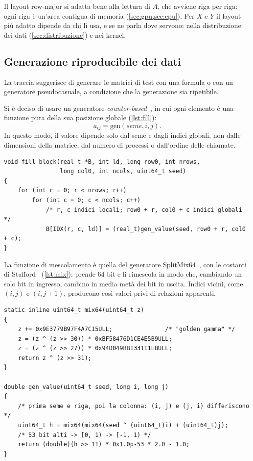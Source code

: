 \documentclass[11pt,a4paper]{article}
\begin{document}
Il layout row-major si adatta bene alla lettura di $A$, che avviene riga per
riga: ogni riga è un'area contigua di memoria (\cref{sec:gpu,sec:cpu}). Per
$X$ e $Y$ il layout più adatto dipende da chi li usa, e se ne parla dove
servono: nella distribuzione dei dati (\cref{sec:distribuzione}) e nei kernel.

\subsection{Generazione riproducibile dei dati}\label{sec:generazione}

La traccia suggerisce di generare le matrici di test con una formula o con un
generatore pseudocasuale, a condizione che la generazione sia ripetibile.

Si è deciso di usare un generatore \emph{counter-based}~\cite{salmon2011}, in cui ogni
elemento è una funzione pura della sua posizione globale (\cref{lst:fill}):
\[
  a_{ij} = \mathrm{gen}(\mathit{seme}, i, j).
\]
In questo modo, il valore dipende solo dal seme e dagli indici globali, non dalle dimensioni
della matrice, dal numero di processi o dall'ordine delle chiamate.

\begin{lstlisting}[caption={Generazione di un blocco di $A$ a partire dagli indici globali (\texttt{matgen.c}).}, label={lst:fill}]
void fill_block(real_t *B, int ld, long row0, int nrows,
                long col0, int ncols, uint64_t seed)
{
    for (int r = 0; r < nrows; r++)
        for (int c = 0; c < ncols; c++)
            /* r, c indici locali; row0 + r, col0 + c indici globali */
            B[IDX(r, c, ld)] = (real_t)gen_value(seed, row0 + r, col0 + c);
}
\end{lstlisting}

La funzione di mescolamento è quella del generatore
SplitMix64~\cite{steele2014}, con le costanti di Stafford~\cite{stafford2011}
(\cref{lst:mix}):
prende 64 bit e li rimescola in modo che, cambiando un solo bit in ingresso,
cambino in media metà dei bit in uscita. Indici vicini, come $(i, j)$ e
$(i, j+1)$, producono così valori privi di relazioni apparenti.

\begin{lstlisting}[caption={Funzione di mescolamento SplitMix64 e calcolo del valore di un elemento (\texttt{matgen.c}).}, label={lst:mix}]
static inline uint64_t mix64(uint64_t z)
{
    z += 0x9E3779B97F4A7C15ULL;               /* "golden gamma" */
    z = (z ^ (z >> 30)) * 0xBF58476D1CE4E5B9ULL;
    z = (z ^ (z >> 27)) * 0x94D049BB133111EBULL;
    return z ^ (z >> 31);
}

double gen_value(uint64_t seed, long i, long j)
{
    /* prima seme e riga, poi la colonna: (i, j) e (j, i) differiscono */
    uint64_t h = mix64(mix64(seed ^ (uint64_t)i) + (uint64_t)j);
    /* 53 bit alti -> [0, 1) -> [-1, 1) */
    return (double)(h >> 11) * 0x1.0p-53 * 2.0 - 1.0;
}
\end{lstlisting}
\end{document}
